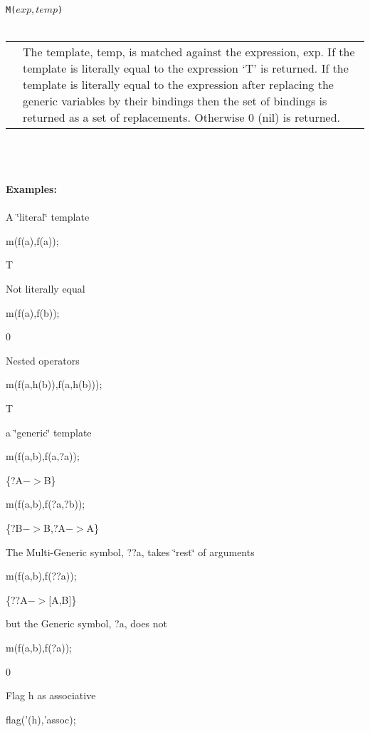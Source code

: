 {\tt M($exp,temp$)} \\
\ \\
\begin{tabular}{lp{11cm}}
\hspace*{0.2cm} & The template, temp, is matched against the expression, exp. If the
template is literally equal to the expression `T' is returned. If the
template is literally equal to the expression after replacing the
generic variables by their bindings then the set of bindings is returned
as a set of replacements. Otherwise 0 (nil) is returned. \\
\end{tabular} \\
\ \\
\ \\
{\bf Examples:} \\
\ \\


 A \char`\"{}literal\char`\"{} template

 m(f(a),f(a));

 T



 Not literally equal

 m(f(a),f(b));

 0



 Nested operators

 m(f(a,h(b)),f(a,h(b)));

 T



 a \char`\"{}generic\char`\"{} template

 m(f(a,b),f(a,?a));

 \{?A$->$B\}



 m(f(a,b),f(?a,?b));

 \{?B$->$B,?A$->$A\}



 The Multi-Generic symbol, ??a, takes \char`\"{}rest\char`\"{} of arguments

 m(f(a,b),f(??a));

 \{??A$->${[}A,B{]}\}



 but the Generic symbol, ?a, does not

 m(f(a,b),f(?a));

 0



 Flag h as associative

 flag('(h),'assoc);

